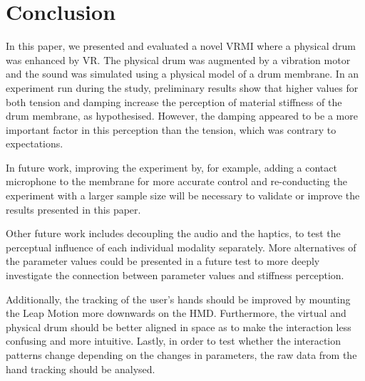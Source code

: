     
    \section{Conclusion}\label{sec:conc}
    
    In this paper, we presented and evaluated a novel VRMI where a physical drum was enhanced by VR. The physical drum was augmented by a vibration motor and the sound was simulated using a physical model of a drum membrane. In an experiment run during the study, preliminary results show that higher values for both tension and damping increase the perception of material stiffness of the drum membrane, as hypothesised. However, the damping appeared to be a more important factor in this perception than the tension, which was contrary to expectations. 
    
    In future work, improving the experiment by, for example, adding a contact microphone to the membrane for more accurate control and re-conducting the experiment with a larger sample size will be necessary to validate or improve the results presented in this paper.
    
    Other future work includes decoupling the audio and the haptics, to test the perceptual influence of each individual modality separately. More alternatives of the parameter values could be presented in a future test to more deeply investigate the connection between parameter values and stiffness perception.
    
    Additionally, the tracking of the user's hands should be improved by mounting the Leap Motion more downwards on the HMD. Furthermore, the virtual and physical drum should be better aligned in space as to make the interaction less confusing and more intuitive.
    Lastly, in order to test whether the interaction patterns change depending on the changes in parameters, the raw data from the hand tracking should be analysed. %
    
